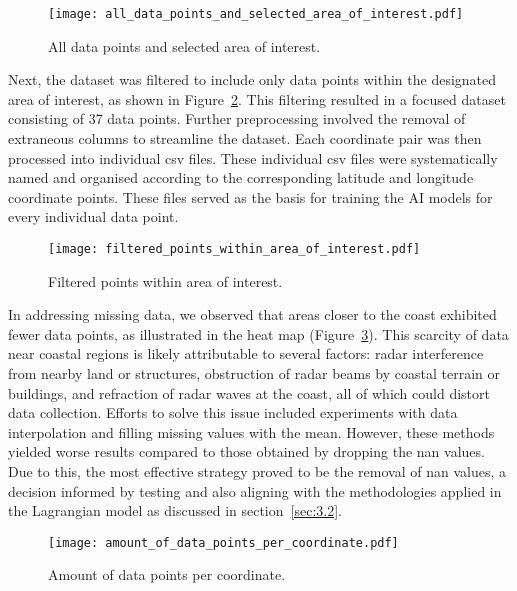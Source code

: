\begin{figure}[htbp]
    \centering
    \texttt{[image: all\_data\_points\_and\_selected\_area\_of\_interest.pdf]}
    \caption[Short sample caption.]{All data points and selected area of interest.\label{fig_3.3}}
\end{figure}

Next, the dataset was filtered to include only data points within the designated area of interest, as shown in Figure~\ref{fig_3.4}. This filtering resulted in a focused dataset consisting of 37 data points. Further preprocessing involved the removal of extraneous columns to streamline the dataset. Each coordinate pair was then processed into individual \acrshort{csv} files. These individual \acrshort{csv} files were systematically named and organised according to the corresponding latitude and longitude coordinate points. These files served as the basis for training the AI models for every individual data point.

\begin{figure}[htbp]
    \centering
    \texttt{[image: filtered\_points\_within\_area\_of\_interest.pdf]}
    \caption[Short sample caption.]{Filtered points within area of interest.\label{fig_3.4}}
\end{figure}

In addressing missing data, we observed that areas closer to the coast exhibited fewer data points, as illustrated in the heat map (Figure~\ref{fig_3.5}). This scarcity of data near coastal regions is likely attributable to several factors: radar interference from nearby land or structures, obstruction of radar beams by coastal terrain or buildings, and refraction of radar waves at the coast, all of which could distort data collection. Efforts to solve this issue included experiments with data interpolation and filling missing values with the mean. However, these methods yielded worse results compared to those obtained by dropping the \acrshort{nan} values. Due to this, the most effective strategy proved to be the removal of \acrshort{nan} values, a decision informed by testing and also aligning with the methodologies applied in the Lagrangian model as discussed in section~\ref{sec:3.2}. 

\begin{figure}[htbp]
    \centering
    \texttt{[image: amount\_of\_data\_points\_per\_coordinate.pdf]}
    \caption[Short sample caption.]{Amount of data points per coordinate.\label{fig_3.5}}
\end{figure}


